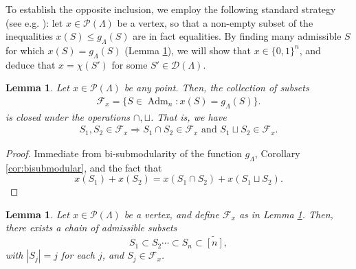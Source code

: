 \documentclass[12pt]{amsart}
\newtheorem{lemma}[definition]{Lemma}
\DeclareMathOperator{\Adm}{Adm}
\newcommand{\cD}{\mathcal{D}}
\newcommand{\cF}{\mathcal{F}}
\newcommand{\cP}{\mathcal{P}}
\newcommand{\wtn}{\widetilde{[n]}}
\begin{document}
To establish the opposite inclusion, we employ the following standard strategy (see e.g. \cite[\S 4.1.2-4.1.3]{lrs}): let $x\in\cP(\Lambda)$ be a vertex, so that a non-empty subset of the inequalities $x(S)\le g_\Lambda(S)$ are in fact equalities. By finding many admissible $S$ for which $x(S)= g_\Lambda(S)$ (Lemma \ref{lem:chain}), we will show that $x\in\{0,1\}^n$, and deduce that $x=\chi(S')$ for some $S'\in\cD(\Lambda)$.

\begin{lemma}\label{lem:F_closed}
    Let $x \in \cP(\Lambda)$ be any point. Then, the collection of subsets
    \begin{align*}
        \mathcal{F}_x = \{S \in\Adm_n: x(S) = g_\Lambda(S)\}.
    \end{align*}
    is closed under the operations $\cap,\sqcup$. That is, we have
    \begin{align*}
     S_1,S_2 \in \mathcal{F}_x \Rightarrow S_1 \cap S_2 \in \mathcal{F}_x \text{ and } S_1 \sqcup S_2 \in \mathcal{F}_x.
    \end{align*}
\end{lemma}
\begin{proof}
Immediate from bi-submodularity of the function $g_\Lambda$, Corollary \ref{cor:bisubmodular}, and the fact that
\begin{equation*}
    x(S_1)+x(S_2)=x(S_1\cap S_2)+x(S_1\sqcup S_2).
\end{equation*}
\end{proof}

\begin{lemma}\label{lem:chain}
    Let $x \in \cP(\Lambda)$ be a vertex, and define $\cF_x$ as in Lemma \ref{lem:F_closed}. Then, there exists a chain of admissible subsets
    \begin{equation*}
     S_1 \subset S_2\cdots\subset S_n\subset \wtn,
    \end{equation*}
    with $|S_j|=j$ for each $j$, and $S_j\in\cF_x$.
\end{lemma}
\end{document}
